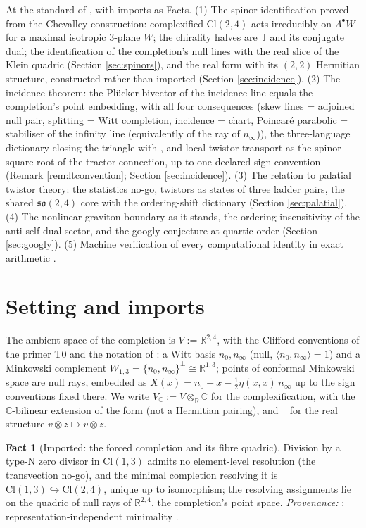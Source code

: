 \documentclass[11pt]{article}
\theoremstyle{definition}
\newtheorem{fact}[theorem]{Fact}
\newcommand{\Cl}{\mathrm{Cl}}
\newcommand{\R}{\mathbb{R}}
\newcommand{\C}{\mathbb{C}}
\newcommand{\T}{\mathbb{T}}
\newcommand{\nO}{n_0}
\newcommand{\nInf}{n_\infty}
\newcommand{\ip}[2]{\langle #1, #2\rangle}
\begin{document}
At the standard of \cite{ButlerT1}, with imports as Facts. (1) The spinor identification proved from the Chevalley construction: complexified $\Cl(2,4)$ acts irreducibly on $\Lambda^\bullet W$ for a maximal isotropic 3-plane $W$; the chirality halves are $\T$ and its conjugate dual; the identification of the completion's null lines with the real slice of the Klein quadric (Section \ref{sec:spinors}), and the real form with its $(2,2)$ Hermitian structure, constructed rather than imported (Section \ref{sec:incidence}). (2) The incidence theorem: the Pl\"ucker bivector of the incidence line equals the completion's point embedding, with all four consequences (skew lines = adjoined null pair, splitting = Witt completion, incidence = chart, Poincar\'e parabolic = stabiliser of the infinity line (equivalently of the ray of $\nInf$)), the three-language dictionary closing the triangle with \cite{ButlerT6}, and local twistor transport as the spinor square root of the tractor connection, up to one declared sign convention (Remark \ref{rem:ltconvention}; Section \ref{sec:incidence}). (3) The relation to palatial twistor theory: the statistics no-go, twistors as states of three ladder pairs, the shared $\mathfrak{so}(2,4)$ core with the ordering-shift dictionary (Section \ref{sec:palatial}). (4) The nonlinear-graviton boundary as it stands, the ordering insensitivity of the anti-self-dual sector, and the googly conjecture at quartic order (Section \ref{sec:googly}). (5) Machine verification of every computational identity in exact arithmetic \cite{ButlerVerifyT9}.

\section{Setting and imports}\label{sec:setting}

The ambient space of the completion is $V := \R^{2,4}$, with the Clifford conventions of the primer T0 \cite{ButlerT0} and the notation of \cite{ButlerT6}: a Witt basis $\nO, \nInf$ (null, $\ip{\nO}{\nInf} = 1$) and a Minkowski complement $W_{1,3} = \{\nO, \nInf\}^\perp \cong \R^{1,3}$; points of conformal Minkowski space are null rays, embedded as $X(x) = \nO + x - \tfrac12\eta(x,x)\,\nInf$ up to the sign conventions fixed there. We write $V_\C := V \otimes_\R \C$ for the complexification, with the $\C$-bilinear extension of the form (not a Hermitian pairing), and $\bar{\phantom{v}}$ for the real structure $v \otimes z \mapsto v \otimes \bar z$.

\begin{fact}[Imported: the forced completion and its fibre quadric]\label{fact:completion}
Division by a type-N zero divisor in $\Cl(1,3)$ admits no element-level resolution (the transvection no-go), and the minimal completion resolving it is $\Cl(1,3) \hookrightarrow \Cl(2,4)$, unique up to isomorphism; the resolving assignments lie on the quadric of null rays of $\R^{2,4}$, the completion's point space. \emph{Provenance:} \cite[Thms.~4.2, 4.10, 4.13]{ButlerT1}; representation-independent minimality \cite[\S4.6]{ButlerT1}.
\end{fact}
\end{document}
